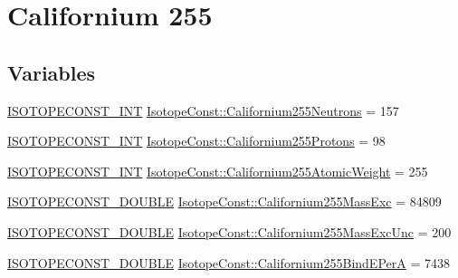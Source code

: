 \hypertarget{group___isotope_const-_californium-_cf255}{}\section{Californium 255}
\label{group___isotope_const-_californium-_cf255}
\subsection*{Variables}
\begin{DoxyCompactItemize}
\item 
\mbox{\hyperlink{group___isotope_const-_macros_ga5f18360b3e99483a35c32d789e62621c}{I\+S\+O\+T\+O\+P\+E\+C\+O\+N\+S\+T\+\_\+\+I\+NT}} \mbox{\hyperlink{group___isotope_const-_californium-_cf255_gae2aa64a77143ae1439b4b62eb2ba4748}{Isotope\+Const\+::\+Californium255\+Neutrons}} = 157
\item 
\mbox{\hyperlink{group___isotope_const-_macros_ga5f18360b3e99483a35c32d789e62621c}{I\+S\+O\+T\+O\+P\+E\+C\+O\+N\+S\+T\+\_\+\+I\+NT}} \mbox{\hyperlink{group___isotope_const-_californium-_cf255_ga9c509d3de0d11ef692c5d9c480cfc8bf}{Isotope\+Const\+::\+Californium255\+Protons}} = 98
\item 
\mbox{\hyperlink{group___isotope_const-_macros_ga5f18360b3e99483a35c32d789e62621c}{I\+S\+O\+T\+O\+P\+E\+C\+O\+N\+S\+T\+\_\+\+I\+NT}} \mbox{\hyperlink{group___isotope_const-_californium-_cf255_ga469e6476ea45f69e145a4f1d26734b24}{Isotope\+Const\+::\+Californium255\+Atomic\+Weight}} = 255
\item 
\mbox{\hyperlink{group___isotope_const-_macros_ga8f45a7272ce02c0b4c65c44636ed719a}{I\+S\+O\+T\+O\+P\+E\+C\+O\+N\+S\+T\+\_\+\+D\+O\+U\+B\+LE}} \mbox{\hyperlink{group___isotope_const-_californium-_cf255_gaffa2ba0a330db034aa795dbe5e343d52}{Isotope\+Const\+::\+Californium255\+Mass\+Exc}} = 84809
\item 
\mbox{\hyperlink{group___isotope_const-_macros_ga8f45a7272ce02c0b4c65c44636ed719a}{I\+S\+O\+T\+O\+P\+E\+C\+O\+N\+S\+T\+\_\+\+D\+O\+U\+B\+LE}} \mbox{\hyperlink{group___isotope_const-_californium-_cf255_ga5dab667a1c87b2ca47329fd32fd6eb24}{Isotope\+Const\+::\+Californium255\+Mass\+Exc\+Unc}} = 200
\item 
\mbox{\hyperlink{group___isotope_const-_macros_ga8f45a7272ce02c0b4c65c44636ed719a}{I\+S\+O\+T\+O\+P\+E\+C\+O\+N\+S\+T\+\_\+\+D\+O\+U\+B\+LE}} \mbox{\hyperlink{group___isotope_const-_californium-_cf255_ga711d651d305e3dc131c4ba72d484ffb8}{Isotope\+Const\+::\+Californium255\+Bind\+E\+PerA}} = 7438
\item 

\end{DoxyCompactItemize}
